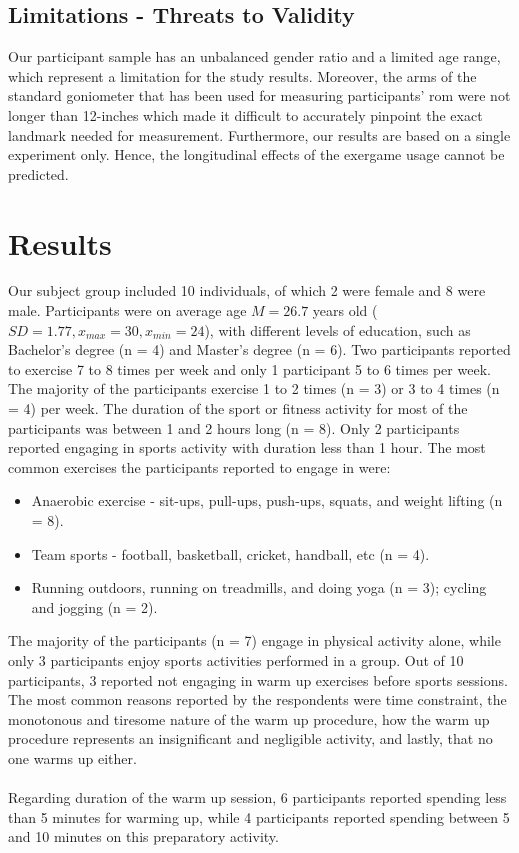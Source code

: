 \subsection{Limitations - Threats to Validity}
Our participant sample has an unbalanced gender ratio and a limited age range, which represent a limitation for the study results. Moreover, the arms of the standard goniometer that has been used for measuring participants' \acrshort{rom} were not longer than 12-inches which made it difficult to accurately pinpoint the exact landmark needed for measurement. Furthermore, our results are based on a single experiment only. Hence, the longitudinal effects of the exergame usage cannot be predicted. 
\section{Results}
Our subject group included 10 individuals, of which 2 were female and 8 were male. Participants were on average age \begin{math}M = 26.7\end{math} years old (\begin{math}SD= 1.77,  x_{max}=30 ,x_{min}= 24 \end{math}), with different levels of education, such as Bachelor's degree (n = 4) and Master's degree (n = 6). Two participants reported to exercise 7 to 8 times per week and only 1 participant 5 to 6 times per week. The majority of the participants exercise 1 to 2 times (n = 3) or 3 to 4 times (n = 4) per week. The duration of the sport or fitness activity for most of the participants was between 1 and 2 hours long (n = 8). Only 2 participants reported engaging in sports activity with duration less than 1 hour. The most common exercises the participants reported to engage in were:
\begin{itemize}
\item Anaerobic exercise - sit-ups, pull-ups, push-ups, squats, and weight lifting (n = 8).
\item Team sports - football, basketball, cricket, handball, etc (n = 4).
\item Running outdoors, running on treadmills, and doing yoga (n = 3); cycling and jogging (n = 2).
\end{itemize}
The majority of the participants (n = 7) engage in physical activity alone, while only 3 participants enjoy sports activities performed in a group. Out of 10 participants, 3 reported not engaging in warm up exercises before sports sessions. The most common reasons reported by the respondents were time constraint, the monotonous and tiresome nature of the warm up procedure, how the warm up procedure represents an insignificant and negligible activity, and lastly, that no one warms up either.\\\\Regarding duration of the warm up session, 6 participants reported spending less than 5 minutes for warming up, while 4 participants reported spending between 5 and 10 minutes on this preparatory activity.\\\\
